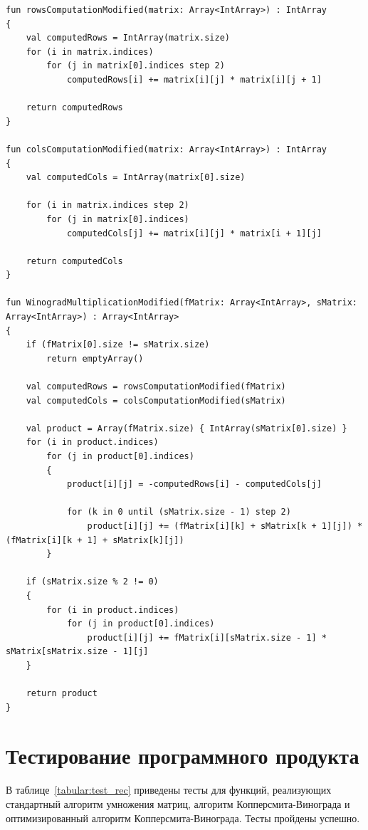 \documentclass[12pt]{report}
\begin{document}
\begin{lstlisting}[caption=Функция реализации улучшенного алгоритма Копперсмита-Винограда,
label={WinogradUpd}]
fun rowsComputationModified(matrix: Array<IntArray>) : IntArray
{
    val computedRows = IntArray(matrix.size)
    for (i in matrix.indices)
        for (j in matrix[0].indices step 2)
            computedRows[i] += matrix[i][j] * matrix[i][j + 1]

    return computedRows
}

fun colsComputationModified(matrix: Array<IntArray>) : IntArray
{
    val computedCols = IntArray(matrix[0].size)

    for (i in matrix.indices step 2)
        for (j in matrix[0].indices)
            computedCols[j] += matrix[i][j] * matrix[i + 1][j]

    return computedCols
}

fun WinogradMultiplicationModified(fMatrix: Array<IntArray>, sMatrix: Array<IntArray>) : Array<IntArray>
{
    if (fMatrix[0].size != sMatrix.size)
        return emptyArray()

    val computedRows = rowsComputationModified(fMatrix)
    val computedCols = colsComputationModified(sMatrix)

    val product = Array(fMatrix.size) { IntArray(sMatrix[0].size) }
    for (i in product.indices)
        for (j in product[0].indices)
        {
            product[i][j] = -computedRows[i] - computedCols[j]

            for (k in 0 until (sMatrix.size - 1) step 2)
                product[i][j] += (fMatrix[i][k] + sMatrix[k + 1][j]) * (fMatrix[i][k + 1] + sMatrix[k][j])
        }

    if (sMatrix.size % 2 != 0)
    {
        for (i in product.indices)
            for (j in product[0].indices)
                product[i][j] += fMatrix[i][sMatrix.size - 1] * sMatrix[sMatrix.size - 1][j]
    }

    return product
}
\end{lstlisting}

\section{Тестирование программного продукта}
В таблице~\ref{tabular:test_rec} приведены тесты для функций, реализующих стандартный алгоритм умножения матриц, алгоритм Копперсмита-Винограда и оптимизированный алгоритм Копперсмита-Винограда. Тесты пройдены успешно.
\end{document}
